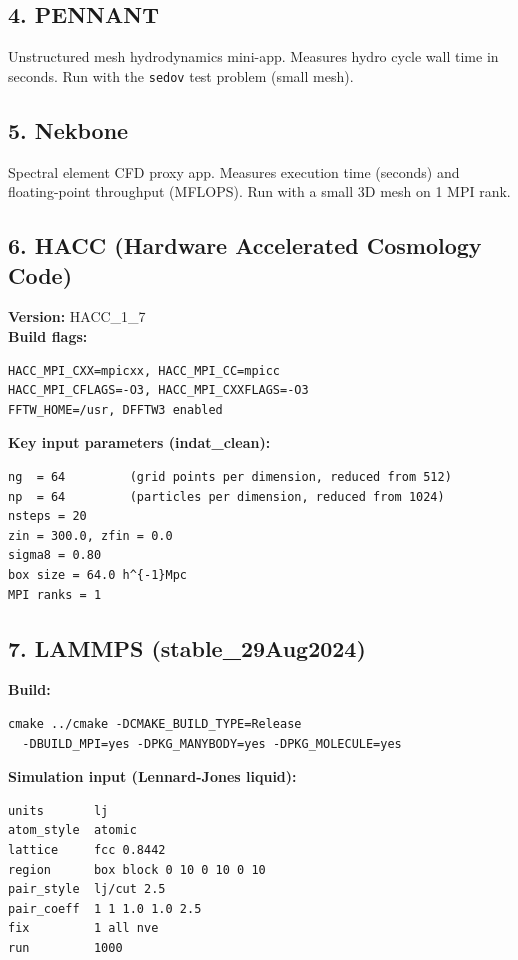 \documentclass[12pt,a4paper]{article}
\begin{document}
\subsection{4. PENNANT}
Unstructured mesh hydrodynamics mini-app. Measures hydro cycle wall time in seconds. Run with the \texttt{sedov} test problem (small mesh).

\subsection{5. Nekbone}
Spectral element CFD proxy app. Measures execution time (seconds) and floating-point throughput (MFLOPS). Run with a small 3D mesh on 1 MPI rank.

\subsection{6. HACC (Hardware Accelerated Cosmology Code)}

\textbf{Version:} HACC\_1\_7\\
\textbf{Build flags:}
\begin{verbatim}
HACC_MPI_CXX=mpicxx, HACC_MPI_CC=mpicc
HACC_MPI_CFLAGS=-O3, HACC_MPI_CXXFLAGS=-O3
FFTW_HOME=/usr, DFFTW3 enabled
\end{verbatim}

\textbf{Key input parameters (indat\_clean):}
\begin{verbatim}
ng  = 64         (grid points per dimension, reduced from 512)
np  = 64         (particles per dimension, reduced from 1024)
nsteps = 20
zin = 300.0, zfin = 0.0
sigma8 = 0.80
box size = 64.0 h^{-1}Mpc
MPI ranks = 1
\end{verbatim}

\subsection{7. LAMMPS (stable\_29Aug2024)}

\textbf{Build:}
\begin{verbatim}
cmake ../cmake -DCMAKE_BUILD_TYPE=Release
  -DBUILD_MPI=yes -DPKG_MANYBODY=yes -DPKG_MOLECULE=yes
\end{verbatim}

\textbf{Simulation input (Lennard-Jones liquid):}
\begin{verbatim}
units       lj
atom_style  atomic
lattice     fcc 0.8442
region      box block 0 10 0 10 0 10
pair_style  lj/cut 2.5
pair_coeff  1 1 1.0 1.0 2.5
fix         1 all nve
run         1000
\end{verbatim}
\end{document}
